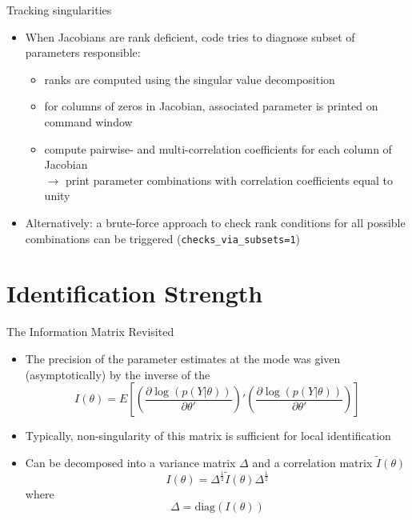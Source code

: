 \begin{frame}{Tracking singularities}

\begin{itemize}
\item When Jacobians are rank deficient, code tries to diagnose subset of parameters responsible:
\begin{itemize}
  \item ranks are computed using the singular value decomposition
  \item for columns of zeros in Jacobian, associated parameter is printed on command window
  \item compute pairwise- and multi-correlation coefficients for each column of Jacobian\\
  $\rightarrow$ print parameter combinations with correlation coefficients equal to unity
\end{itemize}
\item Alternatively: a brute-force approach to check rank conditions for all possible combinations
can be triggered (\texttt{checks\_via\_subsets=1})
\end{itemize}
\end{frame}

\section{Identification Strength}

\renewcommand{\Source}{\textcite{Iskrev2011}}

\begin{frame}{The Information Matrix Revisited}
\begin{itemize}
    \item The precision of the parameter estimates at the mode was given (asymptotically) by the inverse of the 
    \begin{equation}
    I\left( \theta  \right) = E\left[ {\left( {\frac{{\partial \log \left( {p\left( {Y|\theta } \right)} \right)}}{{\partial \theta '}}} \right)'\left( {\frac{{\partial \log \left( {p\left( {Y|\theta } \right)} \right)}}{{\partial \theta '}}} \right)} \right]
    \end{equation}
    \item Typically, non-singularity of this matrix is sufficient for local identification \parencite[for details see][]{Iskrev2011}
    \item Can be decomposed into a variance matrix $\Delta$ and a correlation matrix $\tilde I\left( \theta  \right)$
    \begin{equation}
    I\left( \theta  \right) = {\Delta ^{\frac{1}{2}}}\tilde I\left( \theta  \right){\Delta ^{\frac{1}{2}}} \label{eq:Fisher_decomposed}
    \end{equation}
    where
    \[
    \Delta  = \text{diag}\left( {I\left( \theta  \right)} \right)
    \]
\end{itemize}
\end{frame}

